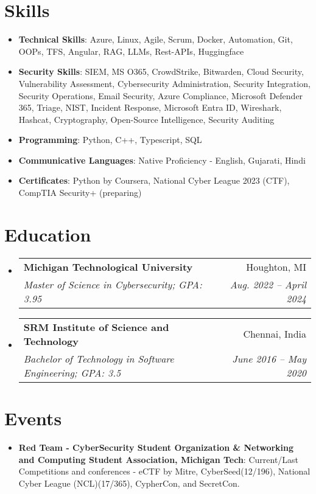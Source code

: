 \documentclass[a4paper,10pt]{article}
\makeatletter
\newcommand{\resumeItem}[2]{
  \item\small{
    \textbf{#1}{: #2 \vspace{-2pt}}
  }
}
\newcommand{\resumeSubheading}[4]{
  \vspace{-1pt}\item
    \begin{tabular*}{0.97\textwidth}[t]{l@{\extracolsep{\fill}}r}
      \textbf{#1} & #2 \\
      \textit{\small#3} & \textit{\small #4} \\
    \end{tabular*}\vspace{-5pt}
}
\newcommand{\resumeSubItem}[2]{\resumeItem{#1}{#2}\vspace{-4pt}}
\newcommand{\resumeSubHeadingListStart}{\begin{itemize}[leftmargin=*]}
\newcommand{\resumeSubHeadingListEnd}{\end{itemize}}
\makeatother
\begin{document}
\section{Skills}
  \resumeSubHeadingListStart
    \resumeSubItem{Technical Skills}
      {Azure, Linux, Agile, Scrum, Docker, Automation, Git, OOPs, TFS, Angular, RAG, LLMs, Rest-APIs, Huggingface}
    \resumeSubItem{Security Skills}
      {SIEM, MS O365, CrowdStrike, Bitwarden, Cloud Security, Vulnerability Assessment, Cybersecurity Administration, Security Integration, Security Operations, Email Security, Azure Compliance, Microsoft Defender 365, Triage, NIST, Incident Response, Microsoft Entra ID, Wireshark, Hashcat, Cryptography, Open-Source Intelligence, Security Auditing}
    \resumeSubItem{Programming}
      {Python, C++, Typescript, SQL}
    \resumeSubItem{Communicative Languages}
      {Native Proficiency - English, Gujarati, Hindi}
    \resumeSubItem{Certificates}
      {Python by Coursera, National Cyber League 2023 (CTF), CompTIA Security+ (preparing)}
  \resumeSubHeadingListEnd

\section{Education}
  \resumeSubHeadingListStart
    \resumeSubheading
      {Michigan Technological University}{Houghton, MI}
      {Master of Science in Cybersecurity; GPA: 3.95}{Aug. 2022 -- April 2024}
    \resumeSubheading
      {SRM Institute of Science and Technology}{Chennai, India}
      {Bachelor of Technology in Software Engineering; GPA: 3.5}{June 2016 -- May 2020}
  \resumeSubHeadingListEnd
  
\section{Events}
  \resumeSubHeadingListStart
  \resumeSubItem{Red Team - CyberSecurity Student Organization \& Networking and Computing Student Association, Michigan Tech}
      {Current/Last Competitions and conferences - eCTF by Mitre, CyberSeed(12/196), National Cyber League (NCL)(17/365), CypherCon, and SecretCon.}
  \resumeSubHeadingListEnd

\end{document}
